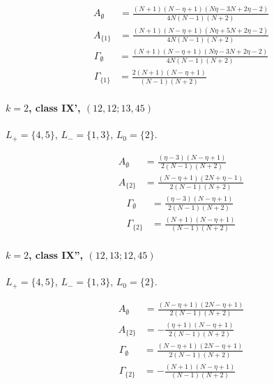 \documentclass[11pt]{article}
\begin{document}
\begin{align*}
  A_{\emptyset} &= \frac{\left(N + 1\right) \left(N - \eta + 1\right) \left(N \eta - 3 N + 2 \eta - 2\right)}{4 N \left(N - 1\right) \left(N + 2\right)} \\
  A_{\{1\}} &= \frac{\left(N + 1\right) \left(N - \eta + 1\right) \left(N \eta + 5 N + 2 \eta - 2\right)}{4 N \left(N - 1\right) \left(N + 2\right)} 
\end{align*}
\begin{align*}
  \Gamma_{\emptyset} &= \frac{\left(N + 1\right) \left(N - \eta + 1\right) \left(N \eta - 3 N + 2 \eta - 2\right)}{4 N \left(N - 1\right) \left(N + 2\right)} \\
  \Gamma_{\{1\}} &= \frac{2 \left(N + 1\right) \left(N - \eta + 1\right)}{\left(N - 1\right) \left(N + 2\right)} 
\end{align*}

\paragraph{$k=2$, class IX', $(12,12;13,45)$}

$L_+=\{4,5\}$, $L_-=\{1,3\}$, $L_0=\{2\}$.

\begin{align*}
  A_{\emptyset} &= \frac{\left(\eta - 3\right) \left(N - \eta + 1\right)}{2 \left(N - 1\right) \left(N + 2\right)} \\
  A_{\{2\}} &= \frac{\left(N - \eta + 1\right) \left(2 N + \eta - 1\right)}{2 \left(N - 1\right) \left(N + 2\right)} 
\end{align*}
\begin{align*}
  \Gamma_{\emptyset} &= \frac{\left(\eta - 3\right) \left(N - \eta + 1\right)}{2 \left(N - 1\right) \left(N + 2\right)} \\
  \Gamma_{\{2\}} &= \frac{\left(N + 1\right) \left(N - \eta + 1\right)}{\left(N - 1\right) \left(N + 2\right)} 
\end{align*}

\paragraph{$k=2$, class IX'', $(12,13;12,45)$}

$L_+=\{4,5\}$, $L_-=\{1,3\}$, $L_0=\{2\}$.

\begin{align*}
  A_{\emptyset} &= \frac{\left(N - \eta + 1\right) \left(2 N - \eta + 1\right)}{2 \left(N - 1\right) \left(N + 2\right)} \\
  A_{\{2\}} &= - \frac{\left(\eta + 1\right) \left(N - \eta + 1\right)}{2 \left(N - 1\right) \left(N + 2\right)} 
\end{align*}
\begin{align*}
  \Gamma_{\emptyset} &= \frac{\left(N - \eta + 1\right) \left(2 N - \eta + 1\right)}{2 \left(N - 1\right) \left(N + 2\right)} \\
  \Gamma_{\{2\}} &= - \frac{\left(N + 1\right) \left(N - \eta + 1\right)}{\left(N - 1\right) \left(N + 2\right)} 
\end{align*}
\end{document}

